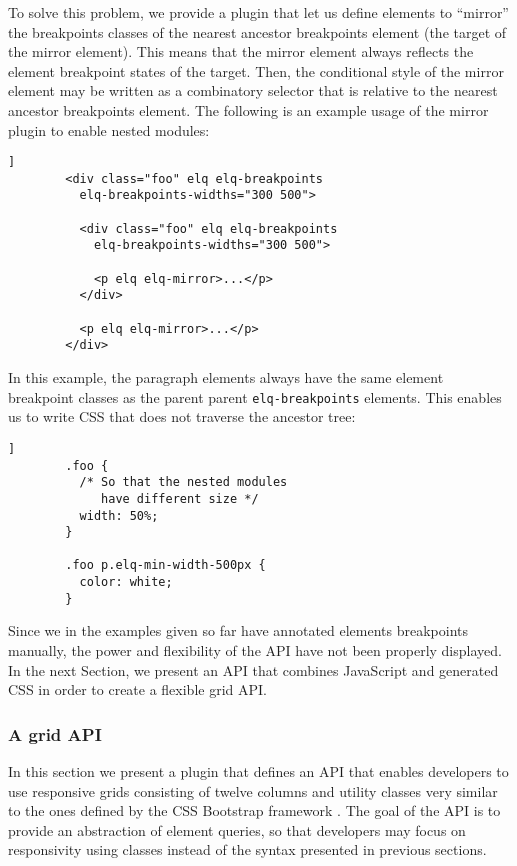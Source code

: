 \documentclass{acm_proc_article-sp}
\newcommand{\code}[1]{\texttt{#1}}
\begin{document}
      To solve this problem, we provide a plugin that let us define elements to ``mirror'' the breakpoints classes of the nearest ancestor breakpoints element (the target of the mirror element).
      This means that the mirror element always reflects the element breakpoint states of the target.
      Then, the conditional style of the mirror element may be written as a combinatory selector that is relative to the nearest ancestor breakpoints element.
      The following is an example usage of the mirror plugin to enable nested modules:

      \begin{lstlisting}[gobble=8,caption={},captionpos=b,label={}]]
        <div class="foo" elq elq-breakpoints
          elq-breakpoints-widths="300 500">
          
          <div class="foo" elq elq-breakpoints
            elq-breakpoints-widths="300 500">

            <p elq elq-mirror>...</p>
          </div>

          <p elq elq-mirror>...</p>
        </div>
      \end{lstlisting}

      In this example, the paragraph elements always have the same element breakpoint classes as the parent parent \code{elq-breakpoints} elements.
      This enables us to write CSS that does not traverse the ancestor tree:

      \begin{lstlisting}[gobble=8,caption={},captionpos=b,label={code:elq-mirror-example-css}]]
        .foo {
          /* So that the nested modules
             have different size */
          width: 50%;
        }

        .foo p.elq-min-width-500px {
          color: white;
        }
      \end{lstlisting}

      Since we in the examples given so far have annotated elements breakpoints manually, the power and flexibility of the API have not been properly displayed.
      In the next Section, we present an API that combines JavaScript and generated CSS in order to create a flexible grid API.

    \subsubsection{A grid API}
      In this section we present a plugin that defines an API that enables developers to use responsive grids consisting of twelve columns and utility classes very similar to the ones defined by the CSS Bootstrap framework \cite{bootstrap}.
      The goal of the API is to provide an abstraction of element queries, so that developers may focus on responsivity using classes instead of the syntax presented in previous sections.
\end{document}
